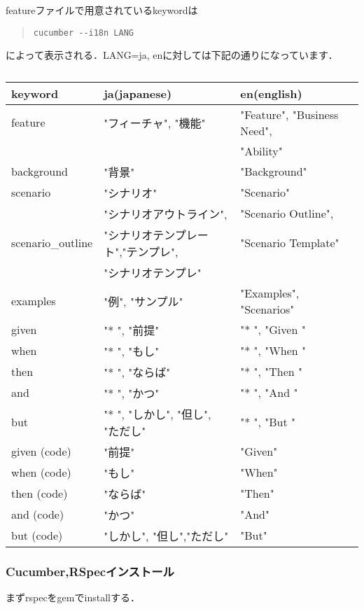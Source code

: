 featureファイルで用意されているkeywordは
\begin{quote}\begin{verbatim}
cucumber --i18n LANG
\end{verbatim}\end{quote}
によって表示される．LANG=ja, enに対しては下記の通りになっています．

\begin{table}[htbp]\begin{center}
\caption{}
\begin{tabular}{llll}
\hline
keyword   &ja(japanese)   &en(english)  \\ \hline
 feature  & "フィーチャ", "機能"      &"Feature", "Business Need",   \\
 & &"Ability"     \\
background  &"背景"  &"Background"   \\
scenario  &"シナリオ"        &"Scenario"     \\
 &"シナリオアウトライン",  &"Scenario Outline",  \\
 scenario\_outline   &"シナリオテンプレート","テンプレ",  & "Scenario Template"   \\
 &"シナリオテンプレ"   & \\
examples  &"例", "サンプル"   &"Examples", "Scenarios"          \\
given   &"* ", "前提"        &"* ", "Given "          \\
when   &"* ", "もし"        &"* ", "When "  \\
then   &"* ", "ならば"       &"* ", "Then "  \\
and    &"* ", "かつ"        &"* ", "And "   \\
but    &"* ", "しかし", "但し", "ただし"  &"* ", "But "   \\
given (code)   &"前提"   &"Given"        \\
when (code)   &"もし"     &"When"         \\
then (code)   &"ならば"   &"Then"         \\
and (code)    &"かつ"     &"And"          \\
but (code)    &"しかし", "但し","ただし"   &"But"          \\
\hline
\end{tabular}
\label{default}
\end{center}\end{table}

\subsubsection{Cucumber,RSpecインストール}
まずrspecをgemでinstallする．

